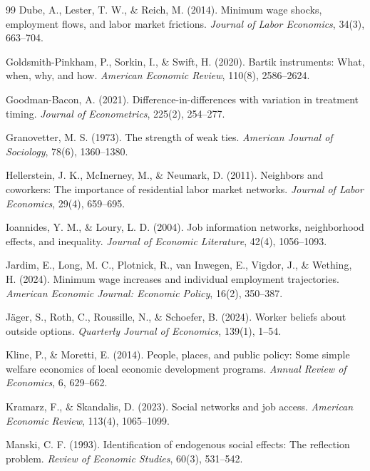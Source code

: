 \documentclass[12pt]{article}
\begin{document}
\begin{thebibliography}{99}
Dube, A., Lester, T. W., \& Reich, M. (2014).
Minimum wage shocks, employment flows, and labor market frictions.
\textit{Journal of Labor Economics}, 34(3), 663--704.

Goldsmith-Pinkham, P., Sorkin, I., \& Swift, H. (2020).
Bartik instruments: What, when, why, and how.
\textit{American Economic Review}, 110(8), 2586--2624.

Goodman-Bacon, A. (2021).
Difference-in-differences with variation in treatment timing.
\textit{Journal of Econometrics}, 225(2), 254--277.

Granovetter, M. S. (1973).
The strength of weak ties.
\textit{American Journal of Sociology}, 78(6), 1360--1380.

Hellerstein, J. K., McInerney, M., \& Neumark, D. (2011).
Neighbors and coworkers: The importance of residential labor market networks.
\textit{Journal of Labor Economics}, 29(4), 659--695.

Ioannides, Y. M., \& Loury, L. D. (2004).
Job information networks, neighborhood effects, and inequality.
\textit{Journal of Economic Literature}, 42(4), 1056--1093.

Jardim, E., Long, M. C., Plotnick, R., van Inwegen, E., Vigdor, J., \& Wething, H. (2024).
Minimum wage increases and individual employment trajectories.
\textit{American Economic Journal: Economic Policy}, 16(2), 350--387.

J{\"a}ger, S., Roth, C., Roussille, N., \& Schoefer, B. (2024).
Worker beliefs about outside options.
\textit{Quarterly Journal of Economics}, 139(1), 1--54.

Kline, P., \& Moretti, E. (2014).
People, places, and public policy: Some simple welfare economics of local economic development programs.
\textit{Annual Review of Economics}, 6, 629--662.

Kramarz, F., \& Skandalis, D. (2023).
Social networks and job access.
\textit{American Economic Review}, 113(4), 1065--1099.

Manski, C. F. (1993).
Identification of endogenous social effects: The reflection problem.
\textit{Review of Economic Studies}, 60(3), 531--542.


\end{thebibliography}
\end{document}
